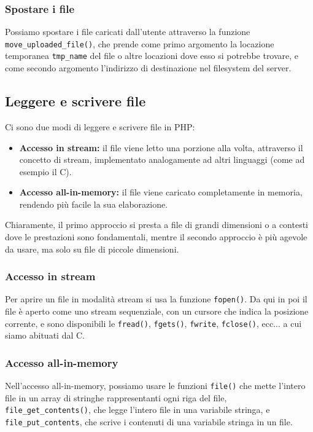 \documentclass[a4paper,11pt]{article}
\begin{document}
\subsubsection{Spostare i file}
Possiamo spostare i file caricati dall'utente attraverso la funzione \lstinline|move_uploaded_file()|, che prende come primo argomento la locazione temporanea \lstinline|tmp_name| del file o altre locazioni dove esso si potrebbe trovare, e come secondo argomento l'indirizzo di destinazione nel filesystem del server.

\subsection{Leggere e scrivere file}
Ci sono due modi di leggere e scrivere file in PHP:
\begin{itemize}
	\item \textbf{Accesso in stream:} il file viene letto una porzione alla volta, attraverso il concetto di stream, implementato analogamente ad altri linguaggi (come ad esempio il C).
	\item \textbf{Accesso all-in-memory:} il file viene caricato completamente in memoria, rendendo più facile la sua elaborazione.
\end{itemize}

Chiaramente, il primo approccio si presta a file di grandi dimensioni o a contesti dove le prestazioni sono fondamentali, mentre il secondo approccio è più agevole da usare, ma solo su file di piccole dimensioni.

\subsubsection{Accesso in stream}
Per aprire un file in modalità stream si usa la funzione \lstinline|fopen()|.
Da qui in poi il file è aperto come uno stream sequenziale, con un cursore che indica la posizione corrente, e sono disponibili le \lstinline|fread()|, \lstinline|fgets()|, \lstinline|fwrite|, \lstinline|fclose()|, ecc... a cui siamo abituati dal C.

\subsubsection{Accesso all-in-memory}
Nell'accesso all-in-memory, possiamo usare le funzioni \lstinline|file()| che mette l'intero file in un array di stringhe rappresentanti ogni riga del file, \lstinline|file_get_contents()|, che legge l'intero file in una variabile stringa, e \lstinline|file_put_contents|, che scrive i contenuti di una variabile stringa in un file.

\TODO %
\end{document}
